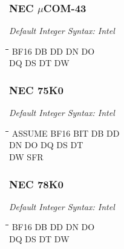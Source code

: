 \subsubsection{NEC $\mu$COM-43}

{\em Default Integer Syntax: Intel}

{\tt\begin{tabbing}
\hspace{3cm}\=\hspace{3cm}\=\hspace{3cm}\=\hspace{3cm}\=\kill
BF16       \> DB          \> DD          \> DN         \> DO \\
DQ         \> DS          \> DT          \> DW \\
\end{tabbing}}

\subsubsection{NEC 75K0}

{\em Default Integer Syntax: Intel}

{\tt\begin{tabbing}
\hspace{3cm}\=\hspace{3cm}\=\hspace{3cm}\=\hspace{3cm}\=\kill
ASSUME     \> BF16        \> BIT         \> DB          \> DD \\
DN         \> DO          \> DQ          \> DS          \> DT \\
DW         \> SFR \\
\end{tabbing}}

\subsubsection{NEC 78K0}

{\em Default Integer Syntax: Intel}

{\tt\begin{tabbing}
\hspace{3cm}\=\hspace{3cm}\=\hspace{3cm}\=\hspace{3cm}\=\kill
BF16       \> DB          \> DD          \> DN          \> DO \\
DQ         \> DS          \> DT          \> DW \\
\end{tabbing}}

